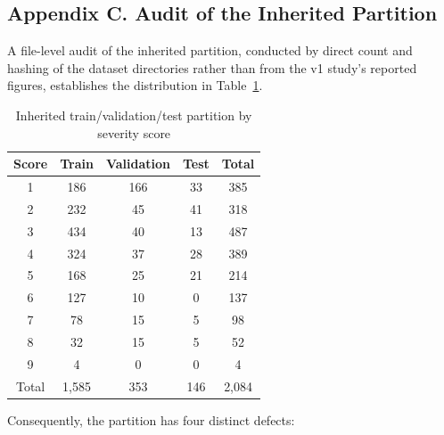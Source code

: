 \documentclass{icsthesis}
\begin{document}
\begin{mainmatter}
			\subsection{Appendix C. Audit of the Inherited Partition}\label{app:partition}

				\setcounter{table}{0}

				A file-level audit of the inherited partition, conducted by direct count and
				hashing of the dataset directories rather than from the v1 study's reported
				figures, establishes the distribution in Table~\ref{tab:partition}.

				\begin{table}[htbp]
				\vspace{4ex}
				\centering
					\caption{Inherited train/validation/test partition by severity score}
					\label{tab:partition}
					\begin{tabular}{ccccc}
					\hline
					\hline
					Score & Train & Validation & Test & Total \\ \hline
					1 & 186 & 166 & 33 & 385 \\
					2 & 232 & 45 & 41 & 318 \\
					3 & 434 & 40 & 13 & 487 \\
					4 & 324 & 37 & 28 & 389 \\
					5 & 168 & 25 & 21 & 214 \\
					6 & 127 & 10 & 0 & 137 \\
					7 & 78 & 15 & 5 & 98 \\
					8 & 32 & 15 & 5 & 52 \\
					9 & 4 & 0 & 0 & 4 \\ \hline
					Total & 1,585 & 353 & 146 & 2,084 \\ \hline\hline
					\end{tabular}
				\vspace{4ex}
				\end{table}

				Consequently, the partition has four distinct defects:


\end{mainmatter}
\end{document}
